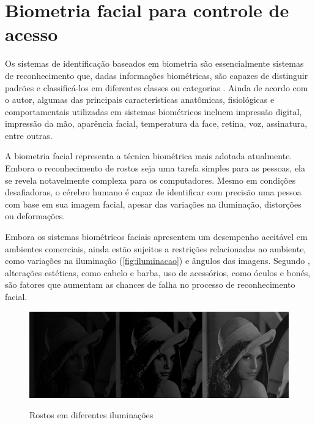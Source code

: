 \section{Biometria facial para controle de acesso}\label{sec:biometriaFacial}

Os sistemas de identificação baseados em biometria são essencialmente sistemas de 
reconhecimento que, dadas informações biométricas, são capazes de distinguir padrões e 
classificá-los em diferentes classes ou categorias \cite[p. 22]{morais2010}. Ainda 
de acordo com o autor, algumas das principais características anatômicas, 
fisiológicas e comportamentais utilizadas em sistemas biométricos incluem 
impressão digital, impressão da mão, aparência facial, temperatura da face, 
retina, voz, assinatura, entre outras.

A biometria facial representa a técnica biométrica mais adotada atualmente. 
Embora o reconhecimento de rostos seja uma tarefa simples para as 
pessoas, ela se revela notavelmente complexa para os computadores. 
Mesmo em condições desafiadoras, o cérebro humano é capaz de identificar 
com precisão uma pessoa com base em sua imagem facial, apesar das variações 
na iluminação, distorções ou deformações.

Embora os sistemas biométricos faciais apresentem um desempenho aceitável em 
ambientes comerciais, ainda estão sujeitos a restrições relacionadas ao ambiente, 
como variações na iluminação (\autoref{fig:iluminacao}) e ângulos das imagens.
Segundo , alterações estéticas, como cabelo e barba, uso de
acessórios, como óculos e bonés, são fatores que aumentam as chances de falha no processo
de reconhecimento facial.

\begin{figure}[h!]
    \centering
    \caption{Rostos em diferentes iluminações}
    \includegraphics[scale=0.2]{figuras/iluminacao.png}
    \label{fig:iluminacao}
    \centering
\end{figure}

